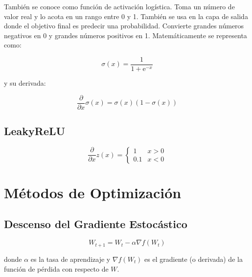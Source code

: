 Tambi\'en se conoce como funci\'on de activaci\'on log\'istica. Toma un n\'umero de valor real y lo acota en un rango entre 0 y 1. Tambi\'en se usa en la capa de salida donde el objetivo final es predecir una probabilidad. Convierte grandes números negativos en 0 y grandes números positivos en 1. Matem\'aticamente se representa como:

\begin{equation}
\sigma(x) = \frac{1}{1+\mathrm{e}^{-x}}
\label{eq:sigmoide}
\end{equation}

\noindent y su derivada:

\begin{equation}
\frac{\partial}{\partial x} \sigma(x) = \sigma(x)(1-\sigma(x))
\label{eq:sigmoide_derivada}
\end{equation}

\vspace*{0.5cm}

\subsection{LeakyReLU}
\label{leakyrelu_title}

\begin{equation}
\frac{\partial}{\partial x} z(x) = 
\begin{cases}
1   & x > 0 \\
0.1 & x < 0
\end{cases} \label{eq:leaky_derivate}
\end{equation}


\section{M\'etodos de Optimizaci\'on}

\subsection{Descenso del Gradiente Estoc\'astico}

\begin{equation}
W_{t+1} = W_t - \alpha \nabla f(W_t)
\label{eq:sgd}
\end{equation}

\vspace*{0.3cm}

donde $\alpha$ es la tasa de aprendizaje y $\nabla f(W_t)$ es el gradiente (o derivada) de la funci\'on de p\'erdida con respecto de $W$.


